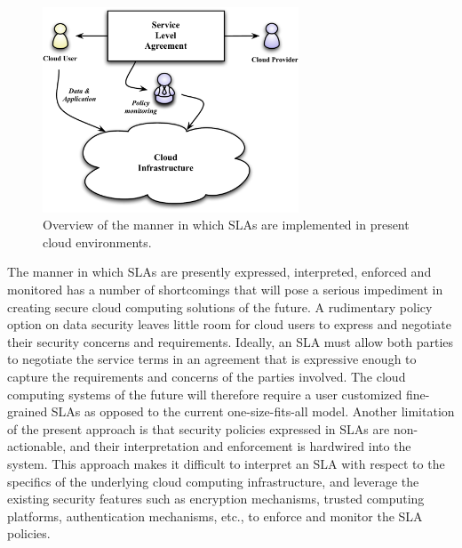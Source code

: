 \documentclass[10pt, conference, compsoc]{IEEEtran}
\begin{document}
\begin{figure}[!t]
\centering
\includegraphics[width=3in]{Overview.pdf}
\caption{Overview of the manner in which SLAs are implemented in present cloud environments.}
\label{fig:overview}
\end{figure}

The manner in which SLAs are presently expressed, interpreted, enforced and monitored has a number of shortcomings that will pose a serious impediment in creating secure cloud computing solutions of the future.  A  rudimentary policy option on data security leaves little room for cloud users to express and negotiate their security concerns and requirements. Ideally, an SLA must allow both parties to negotiate the service terms in an agreement that is expressive enough to capture the requirements and concerns of the parties involved. The cloud computing systems of the future will therefore require a user customized fine-grained SLAs as opposed to the current one-size-fits-all model. Another limitation of the present approach is that security policies expressed in SLAs are non-actionable, and their interpretation and enforcement is hardwired into the system. This approach makes it difficult to interpret an SLA with respect to the specifics of the underlying cloud computing infrastructure, and leverage the existing security features such as encryption mechanisms, trusted computing platforms, authentication mechanisms, etc., to enforce and monitor the SLA policies. 
\end{document}
